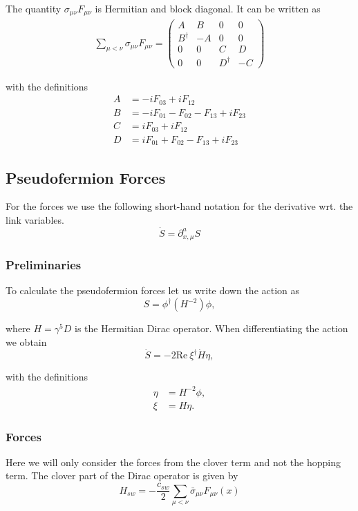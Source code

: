 \documentclass[12pt]{article}
\newcommand{\re}{\mathrm{Re}}
\begin{document}
The quantity $\sigma_{\mu\nu}F_{\mu\nu}$ is Hermitian and block diagonal. It can be written as
\begin{align}
 \sum_{\mu<\nu}\sigma_{\mu\nu}F_{\mu\nu} =
 \begin{pmatrix}
 A & B & 0 & 0 \\
 B^\dagger & -A & 0 & 0 \\
 0  & 0 & C & D \\
 0 & 0 & D^\dagger & -C
 \end{pmatrix}
\end{align}

with the definitions
\begin{align}
 A &= -iF_{03}+iF_{12} \\
 B &= -iF_{01}-F_{02}-F_{13}+iF_{23} \\
 C &= iF_{03}+iF_{12} \\
 D &= iF_{01}+F_{02}-F_{13}+iF_{23}
\end{align}

\subsection*{Pseudofermion Forces}
For the forces we use the following short-hand notation for the derivative wrt. the link variables.
\begin{equation}
 \dot{S} = \partial_{x,\mu}^a S
\end{equation}

\subsubsection*{Preliminaries}
To calculate the pseudofermion forces let us write down the action as
\begin{equation}
 S = \phi^\dagger(H^{-2})\phi,
\end{equation}

where $H=\gamma^5D$ is the Hermitian Dirac operator. When differentiating the action we obtain
\begin{equation}
 \dot{S} = -2\re~\xi^\dagger\dot{H}\eta,
 \label{eq:dotS}
\end{equation}

with the definitions
\begin{align}
 \eta &= H^{-2}\phi, \\
 \xi &= H\eta.
\end{align}

\subsubsection*{Forces}
Here we will only consider the forces from the clover term and not the hopping term. The clover part of the Dirac operator is given by
\begin{equation}
 H_{sw} = -\frac{c_{sw}}{2}\sum_{\mu<\nu}\bar{\sigma}_{\mu\nu}F_{\mu\nu}(x)
 \label{eq:Hsw}
\end{equation}
\end{document}

